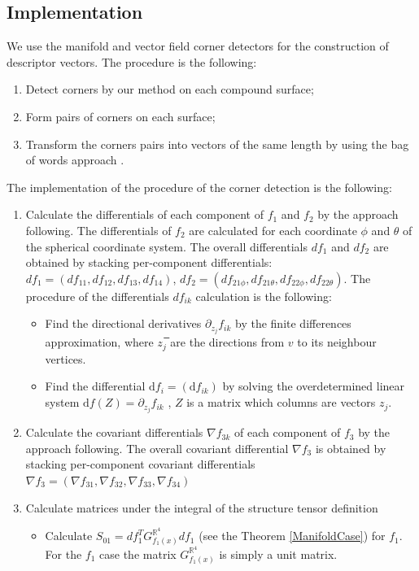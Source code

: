 \documentclass[a4paper,twoside]{article}
\newcommand{\Rone}{\mathbb{R}}
\newcommand{\partderiv}[2]{\partial_{#2} {#1}}
\newcommand{\Diff}{\mathrm{d}}
\begin{document}
\subsection{Implementation}
We use the manifold and vector field corner detectors for the construction of descriptor vectors. The procedure is the following:
\begin{enumerate} 
\item Detect corners by our method on each compound surface;
\item	Form pairs of corners on each surface;
\item Transform the corners pairs into vectors of the same length by using the bag of words approach \cite{bag}.
\end{enumerate}
The implementation of the procedure of the corner detection is the following:
\begin{enumerate} 
\item Calculate the differentials of each component of $f_1$ and $f_2$ by the approach following\cite{GradLeastSQR}. The differentials of $f_2$ are calculated for each coordinate $\phi$ and $\theta$ of the spherical coordinate system. The overall differentials $df_1$ and $df_2$ are obtained by stacking per-component differentials: $df_1 = (df_{11}, df_{12}, df_{13}, df_{14})$, $df_2 = (df_{21\phi}, df_{21\theta}, df_{22\phi}, df_{22\theta})$. The procedure of the differentials $df_{ik}$ calculation is the following:
\begin{itemize}
			\item Find the directional derivatives $\partderiv{f_{ik}}{z_j}$ by the finite differences approximation, where $z_j$̅ are the directions from $v$ to its neighbour vertices. 
			\item Find the differential $\Diff f_i=(\Diff f_{ik})$ by solving the overdetermined linear system $\Diff f(Z)=\partderiv{f_{ik}}{z_j}$ , $Z$  is a matrix which columns are vectors $z_j$.
\end{itemize}
\item Calculate the covariant differentials $\nabla f_{3k}$ of each component of $f_3$ by the approach following\cite{CovariantCalc}. The overall covariant differential $\nabla f_3$ is obtained by stacking per-component covariant differentials $\nabla f_3 = (\nabla f_{31}, \nabla f_{32}, \nabla f_{33}, \nabla f_{34})$
\item Calculate matrices under the integral of the structure tensor definition
\begin{itemize}
		\item Calculate $S_{01}=df_1^T G^{\Rone^4}_{f_1(x)} df_1$ (see the Theorem \ref{ManifoldCase}) for $f_1$. For the $f_1$ case the matrix  $G^{\Rone^4}_{f_1(x)}$ is simply a unit matrix.

\end{itemize}
\end{enumerate}
\end{document}
